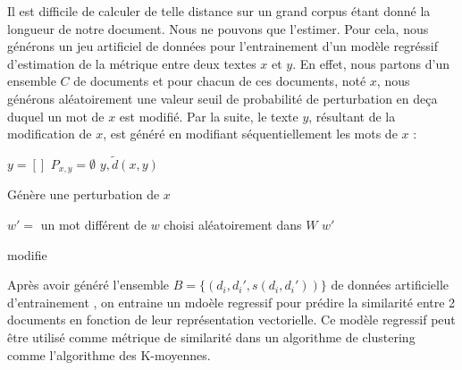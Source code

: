 Il est difficile de calculer de telle distance sur un grand corpus étant donné la longueur de notre document. 
Nous ne pouvons que l'estimer. Pour cela, nous générons un jeu artificiel de données pour l'entrainement d'un modèle regréssif d'estimation de la métrique entre deux textes $x$ et $y$. En effet, nous partons d'un ensemble $C$ de documents et pour chacun de ces documents, noté $x$, nous générons aléatoirement une valeur seuil de probabilité de perturbation en deça duquel un mot de $x$ est modifié. Par la suite, le texte  $y$, résultant de la modification de $x$, est généré en modifiant séquentiellement les mots de $x$ :

\begin{algorithm}[H]
 $y = [] $\; 
 $P_{x,y} = \emptyset$\;
 \Return $y, \widetilde{d}(x,y)$\;
 \caption{Génère une perturbation de $x$} \label{algo:similarite:perturbation}
\end{algorithm}


\begin{algorithm}[H]
 $w' = $ un mot différent de $w$ choisi aléatoirement dans $W$
 \Return $w'$
 \caption{modifie} \label{algo:similarite:modifiemot}
\end{algorithm}

Après avoir généré l'ensemble $B = \lbrace (d_i, d_i', s(d_i, d_i'))\rbrace$ de données artificielle d'entrainement , on entraine un mdoèle regressif pour prédire la similarité entre 2 documents en fonction de leur représentation vectorielle. Ce modèle regressif peut être utilisé comme métrique de similarité dans un algorithme de clustering comme l'algorithme des K-moyennes.

